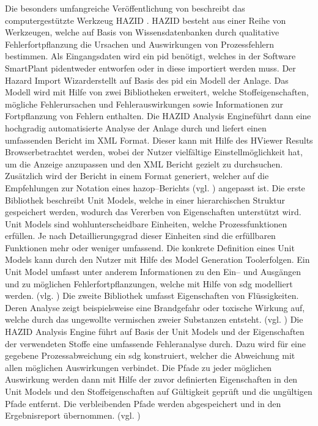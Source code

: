 Die besonders umfangreiche Ver\"offentlichung von \citeauthor{McCoy_1999} beschreibt das computergest\"utzte Werkzeug HAZID \cite{McCoy_1999, McCoy_1999a, McCoy_1999b, McCoy_2000, McCoy_2000a}. HAZID besteht aus einer Reihe von Werkzeugen, welche auf Basis von Wissensdatenbanken durch qualitative Fehlerfortpflanzung die Ursachen und Auswirkungen von Prozessfehlern bestimmen. Als Eingangsdaten wird ein \ac{pid} ben\"otigt, welches in der Software \glqq SmartPlant \ac{pid}\grqq { }entweder entworfen oder in diese importiert werden muss. Der \glqq Hazard Import Wizard\grqq { }erstellt auf Basis des \ac{pid} ein Modell der Anlage. Das Modell wird mit Hilfe von zwei Bibliotheken erweitert, welche Stoffeigenschaften, m\"ogliche Fehlerursachen und Fehlerauswirkungen sowie Informationen zur Fortpflanzung von Fehlern enthalten. Die \glqq HAZID Analysis Engine\grqq { }f\"uhrt dann eine hochgradig automatisierte Analyse der Anlage durch und liefert einen umfassenden Bericht im XML Format. Dieser kann mit Hilfe des \glqq HViewer Results Browser\grqq { }betrachtet werden, wobei der Nutzer vielf\"altige Einstellm\"oglichkeit hat, um die Anzeige anzupassen und den XML Bericht gezielt zu durchsuchen. Zus\"atzlich wird der Bericht in einem Format generiert, welcher auf die Empfehlungen zur Notation eines \ac{hazop}--Berichts {(vgl. \cite{Crawley_2015})} angepasst ist. \newline
Die erste Bibliothek beschreibt \glqq Unit Models\grqq{}, welche in einer hierarchischen Struktur gespeichert werden, wodurch das Vererben von Eigenschaften unterst\"utzt wird. Unit Models sind wohlunterscheidbare Einheiten, welche Prozessfunktionen erf\"ullen. Je nach Detaillierungsgrad dieser Einheiten sind die erf\"ullbaren Funktionen mehr oder weniger umfassend. Die konkrete Definition eines Unit Models kann durch den Nutzer mit Hilfe des \glqq Model Generation Tool\grqq { }erfolgen. Ein Unit Model umfasst unter anderem Informationen zu den {Ein-- und Aus}g\"angen und zu m\"oglichen Fehlerfortpflanzungen, welche mit Hilfe von \ac{sdg} modelliert werden. {(vlg. \cite{McCoy_1999a})} \newline
Die zweite Bibliothek umfasst Eigenschaften von Fl\"ussigkeiten. Deren Analyse zeigt beispielsweise eine Brandgefahr oder toxische Wirkung auf, welche durch das ungewollte vermischen zweier Substanzen entsteht. {(vgl. \cite{McCoy_1999b})} \newline
Die HAZID Analysis Engine f\"uhrt auf Basis der Unit Models und der Eigenschaften der verwendeten Stoffe eine umfassende Fehleranalyse durch. Dazu wird f\"ur eine gegebene Prozessabweichung ein \ac{sdg} konstruiert, welcher die Abweichung mit allen m\"oglichen Auswirkungen verbindet. Die Pfade zu jeder m\"oglichen Auswirkung werden dann mit Hilfe der zuvor definierten Eigenschaften in den Unit Models und den Stoffeigenschaften auf G\"ultigkeit gepr\"uft und die ung\"ultigen Pfade entfernt. Die verbleibenden Pfade werden abgespeichert und in den Ergebnisreport \"ubernommen. {(vgl. \cite{McCoy_1999b, McCoy_2000a})}\newline
